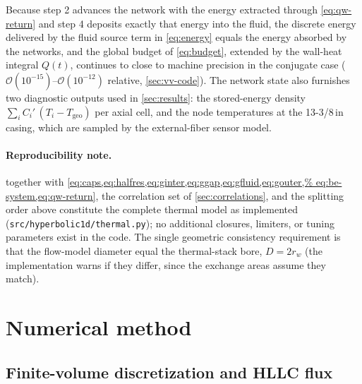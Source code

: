 \documentclass[11pt]{article}
\begin{document}
Because step 2 advances the network with the energy extracted through
\cref{eq:qw-return} and step 4 deposits exactly that energy into the
fluid, the discrete energy delivered by the fluid source term in
\cref{eq:energy} equals the energy absorbed by the networks, and the
global budget of \cref{eq:budget}, extended by the wall-heat integral
$Q(t)$, continues to close to machine precision in the conjugate case
($\mathcal{O}(10^{-15})$--$\mathcal{O}(10^{-12})$ relative,
\cref{sec:vv-code}). The network state also furnishes two diagnostic
outputs used in \cref{sec:results}: the stored-energy density
$\sum_i C_i'\,(T_i - T_{\mathrm{geo}})$ per axial cell, and the node
temperatures at the 13-3/8\,in casing, which are sampled by the
external-fiber sensor model.

\paragraph{Reproducibility note.}  together with
\cref{eq:caps,eq:halfres,eq:ginter,eq:ggap,eq:gfluid,eq:gouter,%
eq:be-system,eq:qw-return}, the correlation set of
\cref{sec:correlations}, and the splitting order above constitute the
complete thermal model as implemented
(\texttt{src/hyperbolic1d/thermal.py}); no additional closures,
limiters, or tuning parameters exist in the code. The single
geometric consistency requirement is that the flow-model diameter
equal the thermal-stack bore, $D = 2 r_w$ (the implementation warns
if they differ, since the exchange areas assume they match).

\section{Numerical method}
\label{sec:numerics}

\subsection{Finite-volume discretization and HLLC flux}
\end{document}
